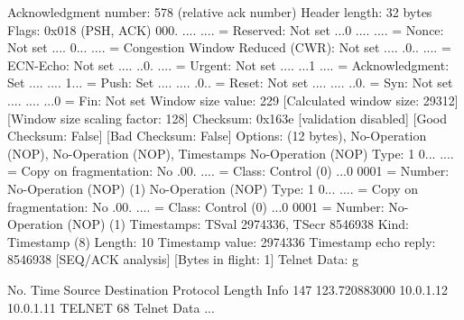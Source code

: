     Acknowledgment number: 578    (relative ack number)
    Header length: 32 bytes
    Flags: 0x018 (PSH, ACK)
        000. .... .... = Reserved: Not set
        ...0 .... .... = Nonce: Not set
        .... 0... .... = Congestion Window Reduced (CWR): Not set
        .... .0.. .... = ECN-Echo: Not set
        .... ..0. .... = Urgent: Not set
        .... ...1 .... = Acknowledgment: Set
        .... .... 1... = Push: Set
        .... .... .0.. = Reset: Not set
        .... .... ..0. = Syn: Not set
        .... .... ...0 = Fin: Not set
    Window size value: 229
    [Calculated window size: 29312]
    [Window size scaling factor: 128]
    Checksum: 0x163e [validation disabled]
        [Good Checksum: False]
        [Bad Checksum: False]
    Options: (12 bytes), No-Operation (NOP), No-Operation (NOP), Timestamps
        No-Operation (NOP)
            Type: 1
                0... .... = Copy on fragmentation: No
                .00. .... = Class: Control (0)
                ...0 0001 = Number: No-Operation (NOP) (1)
        No-Operation (NOP)
            Type: 1
                0... .... = Copy on fragmentation: No
                .00. .... = Class: Control (0)
                ...0 0001 = Number: No-Operation (NOP) (1)
        Timestamps: TSval 2974336, TSecr 8546938
            Kind: Timestamp (8)
            Length: 10
            Timestamp value: 2974336
            Timestamp echo reply: 8546938
    [SEQ/ACK analysis]
        [Bytes in flight: 1]
Telnet
    Data: g

No.     Time           Source                Destination           Protocol Length Info
    147 123.720883000  10.0.1.12             10.0.1.11             TELNET   68     Telnet Data ...

